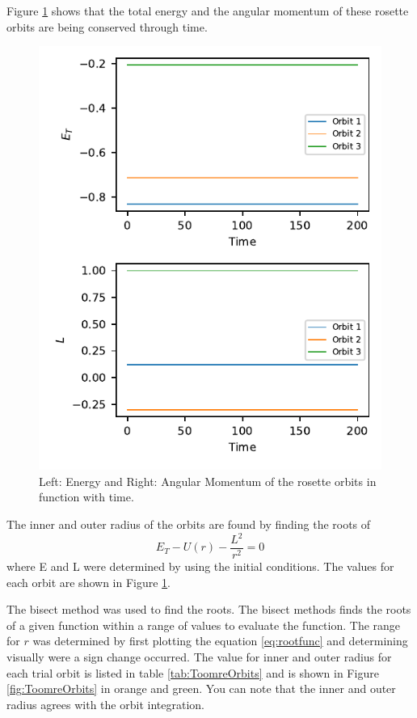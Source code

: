 Figure \ref{fig:conservedQuants} shows that the total energy and the angular momentum of these rosette orbits are being conserved through time.

\begin{figure}[h]
    \centering
    \includegraphics{CodeAndFigures/EnergyMomentumPlot.pdf}
    \caption{Left: Energy and Right: Angular Momentum of the rosette orbits in function with time.}
    \label{fig:conservedQuants}
\end{figure}

The inner and outer radius of the orbits are found by finding the roots of
\begin{equation}
    E_T - U(r) - \frac{L^2}{r^2} = 0
    \label{eq:rootfunc}
\end{equation}
where E and L were determined by using the initial conditions. The values for each orbit are shown in Figure \ref{fig:conservedQuants}. 

The bisect method was used to find the roots. The bisect methods finds the roots of a given function within a range of values to evaluate the function. The range for $r$ was determined by first plotting the equation \ref{eq:rootfunc} and determining visually were a sign change occurred. The value for inner and outer radius for each trial orbit is listed in table \ref{tab:ToomreOrbits} and is shown in Figure \ref{fig:ToomreOrbits} in orange and green. You can note that the inner and outer radius agrees with the orbit integration. 
\clearpage


